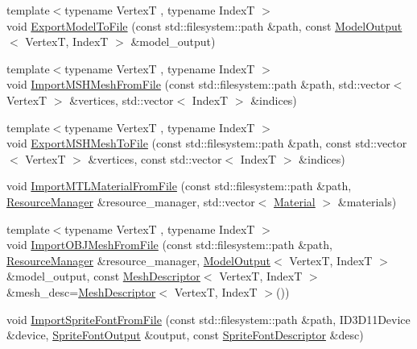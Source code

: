 \begin{DoxyCompactItemize}
\item 
{\footnotesize template$<$typename VertexT , typename IndexT $>$ }\\void \mbox{\hyperlink{namespacemage_1_1rendering_1_1loader_a26b96bf9aacb2ccc4255225b9ec6c0e3}{Export\+Model\+To\+File}} (const std\+::filesystem\+::path \&path, const \mbox{\hyperlink{structmage_1_1rendering_1_1_model_output}{Model\+Output}}$<$ VertexT, IndexT $>$ \&model\+\_\+output)
\item 
{\footnotesize template$<$typename VertexT , typename IndexT $>$ }\\void \mbox{\hyperlink{namespacemage_1_1rendering_1_1loader_abb01cf2507cd2937757564dc52e53807}{Import\+M\+S\+H\+Mesh\+From\+File}} (const std\+::filesystem\+::path \&path, std\+::vector$<$ VertexT $>$ \&vertices, std\+::vector$<$ IndexT $>$ \&indices)
\item 
{\footnotesize template$<$typename VertexT , typename IndexT $>$ }\\void \mbox{\hyperlink{namespacemage_1_1rendering_1_1loader_a17cd0bddfcb4cd430e1c00a74900c086}{Export\+M\+S\+H\+Mesh\+To\+File}} (const std\+::filesystem\+::path \&path, const std\+::vector$<$ VertexT $>$ \&vertices, const std\+::vector$<$ IndexT $>$ \&indices)
\item 
void \mbox{\hyperlink{namespacemage_1_1rendering_1_1loader_aa21fc3fa3fcd33183671fa4e0c92211a}{Import\+M\+T\+L\+Material\+From\+File}} (const std\+::filesystem\+::path \&path, \mbox{\hyperlink{classmage_1_1rendering_1_1_resource_manager}{Resource\+Manager}} \&resource\+\_\+manager, std\+::vector$<$ \mbox{\hyperlink{classmage_1_1rendering_1_1_material}{Material}} $>$ \&materials)
\item 
{\footnotesize template$<$typename VertexT , typename IndexT $>$ }\\void \mbox{\hyperlink{namespacemage_1_1rendering_1_1loader_aafd60b592d989b82026cdebd53cca87e}{Import\+O\+B\+J\+Mesh\+From\+File}} (const std\+::filesystem\+::path \&path, \mbox{\hyperlink{classmage_1_1rendering_1_1_resource_manager}{Resource\+Manager}} \&resource\+\_\+manager, \mbox{\hyperlink{structmage_1_1rendering_1_1_model_output}{Model\+Output}}$<$ VertexT, IndexT $>$ \&model\+\_\+output, const \mbox{\hyperlink{classmage_1_1rendering_1_1_mesh_descriptor}{Mesh\+Descriptor}}$<$ VertexT, IndexT $>$ \&mesh\+\_\+desc=\mbox{\hyperlink{classmage_1_1rendering_1_1_mesh_descriptor}{Mesh\+Descriptor}}$<$ VertexT, IndexT $>$())
\item 
void \mbox{\hyperlink{namespacemage_1_1rendering_1_1loader_a523de9e8d52cb9251843ea0987db462e}{Import\+Sprite\+Font\+From\+File}} (const std\+::filesystem\+::path \&path, I\+D3\+D11\+Device \&device, \mbox{\hyperlink{structmage_1_1rendering_1_1_sprite_font_output}{Sprite\+Font\+Output}} \&output, const \mbox{\hyperlink{classmage_1_1rendering_1_1_sprite_font_descriptor}{Sprite\+Font\+Descriptor}} \&desc)

\end{DoxyCompactItemize}
